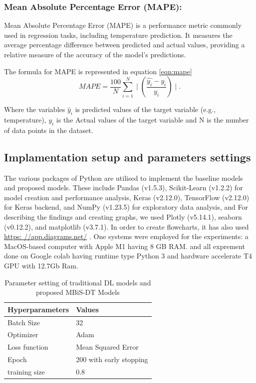 \documentclass[sn-mathphys,Numbered]{sn-jnl}
\theoremstyle{thmstyleone}
\theoremstyle{thmstyletwo}
\theoremstyle{thmstylethree}
\begin{document}
\subsubsection{Mean Absolute Percentage Error (MAPE):}
Mean Absolute Percentage Error (MAPE) is a performance metric commonly used in regression tasks, including temperature prediction. It measures the average percentage difference between predicted and actual values, providing a relative measure of the accuracy of the model's predictions.

The formula for MAPE is represented in equation \ref{eqn:mape}
\begin{equation}
\label{eqn:mape}
MAPE = \frac{100}{N} \sum_{i=1}^{N} \mid(\frac{\hat{y_{i}} - y_{i}}{y_i})\mid .
\end{equation}


Where the variables $\hat{y}_i$ is predicted values of the target variable (e.g., temperature), $y_i$ is the Actual values of the target variable and N is the number of data points in the dataset.



\subsection{Implamentation setup and parameters settings}
The various packages of Python are utilised to implement the baseline models and  proposed models. These include Pandas (v1.5.3), Scikit-Learn (v1.2.2) for model creation and performance analysis, Keras (v2.12.0), TensorFlow (v2.12.0) for Keras backend, and NumPy (v1.23.5) for exploratory data analysis,  and For describing the findings and creating graphs, we used Plotly (v5.14.1), seaborn (v0.12.2), and matplotlib (v3.7.1). In order to create flowcharts, it has also used \href{https: //app.diagrams.net/}{https: //app.diagrams.net/} . One systems were employed for the experiments:  a MacOS-based computer with Apple M1 having 8 GB RAM. and all exprement done on Google colab having runtime type Python 3 and hardware accelerate T4 GPU with 12.7Gb Ram.

\begin{table}[h!]
\centering
  \caption{Parameter setting of traditional DL models and proposed MBiS-DT Models}
  \label{tab: my-table}
  \begin{tabular}{ll}
  \hline Hyperparameters & Values        \\ \hline
  Batch Size               & 32                     \\
  Optimizer                 & Adam                   \\
  Loss function            & Mean Squared Error      \\
  Epoch                    & 200 with early stopping \\
  training size             & 0.8                   \\ \hline
  \end{tabular}
  \end{table}
\end{document}
